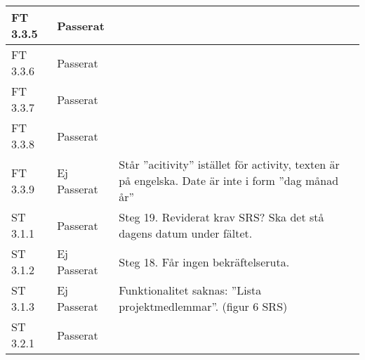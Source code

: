 \documentclass[a4paper]{article}
\begin{document}
\begin{tabular}{| l | l | p{9cm} |}
\hline
FT 3.3.5 & Passerat & \\
\hline
FT 3.3.6 & Passerat & \\
\hline
FT 3.3.7 & Passerat & \\
\hline
FT 3.3.8 & Passerat & \\
\hline
FT 3.3.9 & Ej Passerat & Står ”acitivity” istället för activity, texten är på engelska. Date är inte i form ”dag månad år” \\
\hline
ST 3.1.1 & Passerat &  Steg 19. Reviderat krav SRS? Ska det stå dagens datum under fältet.\\
\hline
ST 3.1.2 & Ej Passerat & Steg 18. Får ingen bekräftelseruta. \\
\hline
ST 3.1.3 & Ej Passerat & Funktionalitet saknas: ”Lista projektmedlemmar”. (figur 6 SRS) \\
\hline
ST 3.2.1 & Passerat & \\
\hline
\end{tabular}
\end{document}
